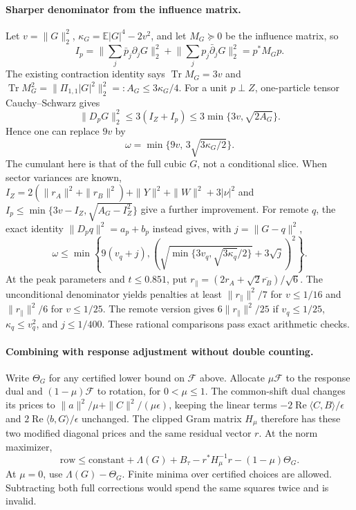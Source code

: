 \paragraph{Sharper denominator from the influence matrix.}
Let $v=\|G\|_2^2$, $\kappa_G=\mathbb E|G|^4-2v^2$, and let $M_G\succeq0$
be the influence matrix, so
\[
 I_p=\Big\|\sum_j\bar p_j\partial_jG\Big\|_2^2+
       \Big\|\sum_jp_j\bar\partial_jG\Big\|_2^2=p^*M_Gp.
\]
The existing contraction identity says
$\operatorname{Tr}M_G=3v$ and
$\operatorname{Tr}M_G^2=\|\Pi_{1,1}|G|^2\|_2^2=:A_G\le3\kappa_G/4$.
For a unit $p\perp Z$, one-particle tensor Cauchy--Schwarz gives
\[
 \|D_pG\|_2^2\le3(I_Z+I_p)
 \le3\min\{3v,\sqrt{2A_G}\}.
\]
Hence one can replace $9v$ by
\[
 \boxed{\omega=\min\{9v,\,3\sqrt{3\kappa_G/2}\}.}
\]
The cumulant here is that of the full cubic $G$, not a conditional slice.
When sector variances are known,
$I_Z=2(\|r_A\|^2+\|r_B\|^2)+\|Y\|^2+\|W\|^2+3|\nu|^2$ and
$I_p\le\min\{3v-I_Z,\sqrt{A_G-I_Z^2}\}$ give a further improvement.
For remote $q$, the exact identity
$\|D_pq\|^2=a_p+b_p$ instead gives, with $j=\|G-q\|^2$,
\[
 \omega\le\min\left\{9(v_q+j),
 \left(\sqrt{\min\{3v_q,\sqrt{3\kappa_q}/2\}}+3\sqrt j\right)^2\right\}.
\]
At the peak parameters and $t\le0.851$, put
$r_{\parallel}=(2r_A+\sqrt2\overline{r_B})/\sqrt6$.
The unconditional denominator yields penalties at least
$\|r_{\parallel}\|^2/7$ for $v\le1/16$ and
$\|r_{\parallel}\|^2/6$ for $v\le1/25$.
The remote version gives $6\|r_{\parallel}\|^2/25$ if
$v_q\le1/25$, $\kappa_q\le v_q^2$, and $j\le1/400$.
These rational comparisons pass exact arithmetic checks.

\paragraph{Combining with response adjustment without double counting.}
Write $\Theta_G$ for any certified lower bound on $\mathcal F$ above. Allocate
$\mu\mathcal F$ to the response dual and $(1-\mu)\mathcal F$ to rotation, for
$0<\mu\le1$. The common-shift dual changes its prices to
$\|a\|^2/\mu+\|C\|^2/(\mu\epsilon)$, keeping the linear terms
$-2\operatorname{Re}\langle C,B\rangle/\epsilon$
and $2\operatorname{Re}\langle b,G\rangle/\epsilon$ unchanged.
The clipped Gram matrix $H_\mu$ therefore has these two modified diagonal
prices and the same residual vector $r$. At the norm maximizer,
\[
 \text{row}\le\text{constant}+\Lambda(G)+B_\tau
      -r^*H_\mu^{-1}r-(1-\mu)\Theta_G.
\]
At $\mu=0$, use $\Lambda(G)-\Theta_G$. Finite minima over certified choices
are allowed. Subtracting both full corrections would spend the same squares
twice and is invalid.

